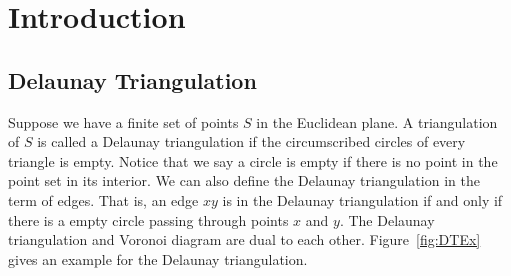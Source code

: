\chapter{Introduction}
\section{Delaunay Triangulation}

Suppose we have a finite set of points $S$ in the Euclidean plane. A triangulation of $S$ is called a Delaunay triangulation if the circumscribed circles of every triangle is empty. Notice that we say a circle is empty if there is no point in the point set in its interior. We can also define the Delaunay triangulation in the term of edges. That is, an edge $xy$ is in the Delaunay triangulation if and only if there is a empty circle passing through points $x$ and $y$. The Delaunay triangulation and Voronoi diagram are dual to each other.
Figure~\ref{fig:DTEx} gives an example for the Delaunay triangulation. 



